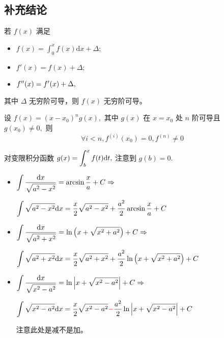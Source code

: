 \begin{Appendices}[附录]

\chapter{补充结论}


若 $ f(x) $ 满足
\begin{itemize}
    \item $ f(x)=\int_0^xf(x)\mathrm{d}x + \Delta; $ 
    \item $ f'(x)=f(x)+\Delta; $ 
    \item $ f^{\prime\prime}(x) = f'(x) + \Delta,$ 
\end{itemize}

其中 $ \Delta $ 无穷阶可导，则 $ f(x) $ 无穷阶可导。


设 $ f(x) = (x - x_0)^ng(x), $ 其中 $ g(x) $ 在 $ x = x_0 $ 处 $ n $ 阶可导且 $ g(x_0) \neq 0, $ 则
$$
    \forall  i < n, f^{(i)}(x_0) = 0, f^{(n)}\neq 0
$$  


对变限积分函数 $ g(x) = \displaystyle \int_b^x f(t)\mathrm{d}t, $ 注意到 $ g(b) = 0. $ 


\begin{itemize}
    \item $ \displaystyle \int \dfrac{\mathrm{d}x}{\displaystyle\sqrt{a^2 - x^2}} =  \arcsin \dfrac{x}{a} + C \Rightarrow $
    
    $ \displaystyle \int \displaystyle\sqrt{a^2 - x^2} \mathrm{d}x = \dfrac{x}{2}\displaystyle\sqrt{a^2 - x^2} + \dfrac{a^2}{2}\arcsin \dfrac{x}{a} + C $ 
    \item $ \displaystyle \int \dfrac{\mathrm{d}x}{\displaystyle\sqrt{a^2 + x^2}} =  \ln\left(x + \displaystyle\sqrt{x^2+a^2}\right) + C \Rightarrow $
    
    $ \displaystyle \int \displaystyle\sqrt{a^2 + x^2} \mathrm{d}x = \dfrac{x}{2}\displaystyle\sqrt{a^2 + x^2} + 
    \dfrac{a^2}{2}\ln\left(x + \displaystyle\sqrt{x^2+a^2}\right) + C $ 
    \item $ \displaystyle \int \dfrac{\mathrm{d}x}{\displaystyle\sqrt{x^2 - a^2}} = \ln\left|x + \displaystyle\sqrt{x^2 - a^2}\right| + C \Rightarrow $
    
    $ \displaystyle \int \displaystyle\sqrt{x^2 - a^2} \mathrm{d}x = \dfrac{x}{2}\displaystyle\sqrt{x^2 - a^2} \textcolor{red}{\bf{-}} 
    \dfrac{a^2}{2}\ln\left|x + \displaystyle\sqrt{x^2 - a^2}\right| + C $ 

    注意此处是减不是加。
\end{itemize}


\end{Appendices}

